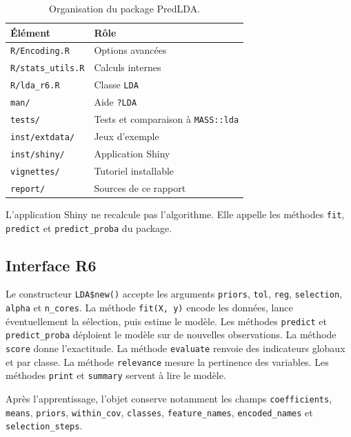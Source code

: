 \documentclass[11pt,a4paper]{article}
\begin{document}
\begin{table}[H]
\centering
\begin{tabular}{@{}ll@{}}
\toprule
\'El\'ement & R\^ole \\
\midrule
\texttt{R/Encoding.R} & Options avanc\'ees \\
\texttt{R/stats\_utils.R} & Calculs internes \\
\texttt{R/lda\_r6.R} & Classe \texttt{LDA} \\
\texttt{man/} & Aide \texttt{?LDA} \\
\texttt{tests/} & Tests et comparaison \`a \texttt{MASS::lda} \\
\texttt{inst/extdata/} & Jeux d'exemple \\
\texttt{inst/shiny/} & Application Shiny \\
\texttt{vignettes/} & Tutoriel installable \\
\texttt{report/} & Sources de ce rapport \\
\bottomrule
\end{tabular}
\caption{Organisation du package PredLDA.}
\end{table}

L'application Shiny ne recalcule pas l'algorithme. Elle appelle les m\'ethodes
\texttt{fit}, \texttt{predict} et \texttt{predict\_proba} du package.

\subsection{Interface R6}

Le constructeur \texttt{LDA\$new()} accepte les arguments \texttt{priors},
\texttt{tol}, \texttt{reg}, \texttt{selection}, \texttt{alpha} et
\texttt{n\_cores}. La m\'ethode \texttt{fit(X, y)} encode les donn\'ees, lance
\'eventuellement la s\'election, puis estime le mod\`ele. Les m\'ethodes
\texttt{predict} et \texttt{predict\_proba} d\'eploient le mod\`ele sur de
nouvelles observations. La m\'ethode \texttt{score} donne l'exactitude.
La m\'ethode \texttt{evaluate} renvoie des indicateurs globaux et par classe.
La m\'ethode \texttt{relevance} mesure la pertinence des variables.
Les m\'ethodes \texttt{print} et \texttt{summary} servent \`a lire le mod\`ele.

Apr\`es l'apprentissage, l'objet conserve notamment les champs
\texttt{coefficients}, \texttt{means}, \texttt{priors}, \texttt{within\_cov},
\texttt{classes}, \texttt{feature\_names}, \texttt{encoded\_names} et
\texttt{selection\_steps}.
\end{document}
